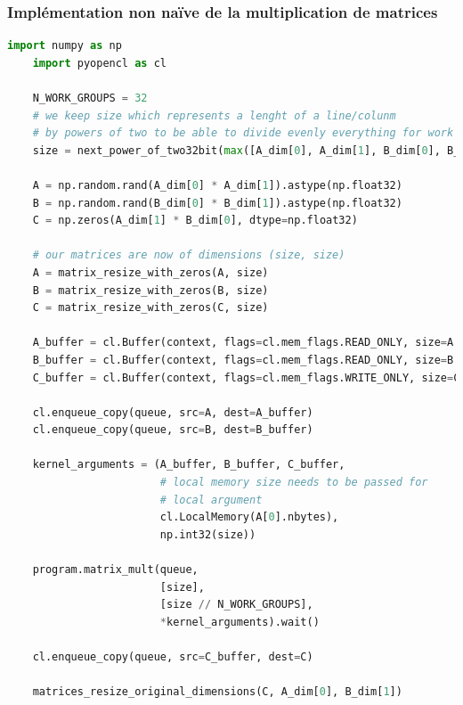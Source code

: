 \begin{frame}
    \frametitle{Implémentation non naïve de la multiplication de matrices}
    \begin{lstlisting}[language=python]
    import numpy as np
    import pyopencl as cl

    N_WORK_GROUPS = 32
    # we keep size which represents a lenght of a line/colunm 
    # by powers of two to be able to divide evenly everything for work groups
    size = next_power_of_two32bit(max([A_dim[0], A_dim[1], B_dim[0], B_dim[1]]))    

    A = np.random.rand(A_dim[0] * A_dim[1]).astype(np.float32)   
    B = np.random.rand(B_dim[0] * B_dim[1]).astype(np.float32)   
    C = np.zeros(A_dim[1] * B_dim[0], dtype=np.float32)

    # our matrices are now of dimensions (size, size)
    A = matrix_resize_with_zeros(A, size)
    B = matrix_resize_with_zeros(B, size)
    C = matrix_resize_with_zeros(C, size)

    A_buffer = cl.Buffer(context, flags=cl.mem_flags.READ_ONLY, size=A.nbytes)
    B_buffer = cl.Buffer(context, flags=cl.mem_flags.READ_ONLY, size=B.nbytes)
    C_buffer = cl.Buffer(context, flags=cl.mem_flags.WRITE_ONLY, size=C.nbytes)

    cl.enqueue_copy(queue, src=A, dest=A_buffer)
    cl.enqueue_copy(queue, src=B, dest=B_buffer)

    kernel_arguments = (A_buffer, B_buffer, C_buffer,
                        # local memory size needs to be passed for
                        # local argument
                        cl.LocalMemory(A[0].nbytes),
                        np.int32(size))

    program.matrix_mult(queue,
                        [size],
                        [size // N_WORK_GROUPS],
                        *kernel_arguments).wait()

    cl.enqueue_copy(queue, src=C_buffer, dest=C)

    matrices_resize_original_dimensions(C, A_dim[0], B_dim[1])
    \end{lstlisting}
\end{frame}

